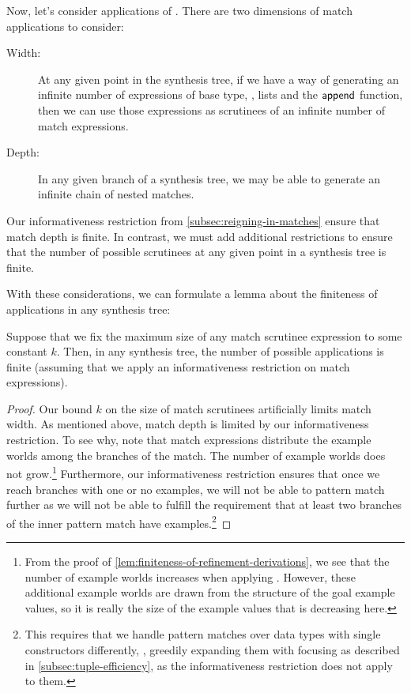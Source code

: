 Now, let's consider applications of .
There are two dimensions of match applications to consider:
\begin{description}
  \item[Width:] At any given point in the synthesis tree, if we have a way of generating an infinite number of expressions of base type, \eg, lists and the $\mathsf{append}$ function, then we can use those expressions as scrutinees of an infinite number of match expressions.
  \item[Depth:] In any given branch of a synthesis tree, we may be able to generate an infinite chain of nested matches.
\end{description}
Our informativeness restriction from \autoref{subsec:reigning-in-matches} ensure that match depth is finite.
In contrast, we must add additional restrictions to ensure that the number of possible scrutinees at any given point in a synthesis tree is finite.

With these considerations, we can formulate a lemma about the finiteness of  applications in any synthesis tree:

\begin{lemma}
  Suppose that we fix the maximum size of any match scrutinee expression to some constant $k$.  Then, in any synthesis tree, the number of possible  applications is finite (assuming that we apply an informativeness restriction on match expressions).
  \label{lem:finiteness-of-match-derivations}
\end{lemma}
\begin{proof}
  Our bound $k$ on the size of match scrutinees artificially limits match width.
  As mentioned above, match depth is limited by our informativeness restriction.
  To see why, note that match expressions distribute the example worlds among the branches of the match.
  The number of example worlds does not grow.\footnote{%
    From the proof of \ref{lem:finiteness-of-refinement-derivations}, we see that the number of example worlds increases when applying .
    However, these additional example worlds are drawn from the structure of the goal example values, so it is really the size of the example values that is decreasing here.
  }
  Furthermore, our informativeness restriction ensures that once we reach branches with one or no examples, we will not be able to pattern match further as we will not be able to fulfill the requirement that at least two branches of the inner pattern match have examples.\footnote{%
    This requires that we handle pattern matches over data types with single constructors differently, \eg, greedily expanding them with focusing as described in \autoref{subsec:tuple-efficiency}, as the informativeness restriction does not apply to them.
  }
\end{proof}

